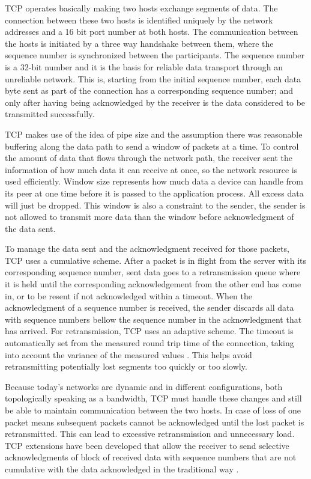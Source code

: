 TCP operates basically making two hosts exchange segments of data. The
connection between these two hosts is identified uniquely by the network addresses and a 16 bit port number at both hosts. The communication between the
hosts is initiated by a three way handshake between them, where the
sequence number is synchronized between the participants. The sequence number
is a 32-bit number and it is the basis for reliable data transport through an unreliable network. This is, starting from the initial sequence
number, each data byte sent as part of the connection has a corresponding
sequence number; and only after having being acknowledged by the receiver is
the data considered to be transmitted successfully.

TCP makes use of the idea of pipe size and the assumption there was reasonable buffering along the data path to send a window of packets at
a time. To control the amount of data that flows through the network path, the
receiver sent the information of how much data it can receive at once, so the
network resource is used efficiently. Window size represents how much data a
device can handle from its peer at one time before it is passed to the
application process. All excess data will just be dropped. This window
is also a constraint to the sender, the sender is not allowed to
transmit more data than the window before acknowledgment of the data sent.

To manage the data sent and the acknowledgment received for those packets, TCP
uses a cumulative scheme. After a packet is in flight from the server with its
corresponding sequence number, sent data goes to a retransmission queue where
it is held until the corresponding acknowledgement from the other end has come in,
or to be resent if not acknowledged within a timeout. When the
acknowledgment of a sequence number is received, the sender discards all data
with sequence numbers bellow the sequence number in the acknowledgment that
has arrived. For retransmission, TCP uses an adaptive scheme. The timeout is
automatically set from the measured round trip time of the connection,
taking into account the variance of the measured values \cite{JacobsonCAC}.
This helps avoid retransmitting potentially lost segments too quickly or too
slowly.

Because today's networks are dynamic and in different configurations, both
topologically speaking as a  bandwidth, TCP must handle these changes and
still be able to maintain communication between the two hosts. In case of
loss of one packet means subsequent packets cannot be acknowledged until the
lost packet is retransmitted. This can lead to excessive retransmission and
unnecessary load. TCP extensions have been developed that allow the receiver to
send selective acknowledgments of block of received data with sequence numbers
that are not cumulative with the data acknowledged in the traditional
way \cite{RFC2018}.


